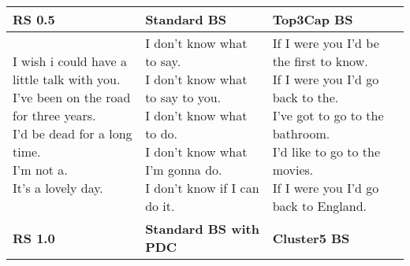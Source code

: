 \documentclass[thesis.tex]{subfiles}
\begin{document}
\begin{table*}[t]
\begin{tabular}{|l|l|l|}
    \hline \hline
    \footnotesize \textbf{RS 0.5} &  \footnotesize \textbf{Standard BS} &  \footnotesize \textbf{Top3Cap BS} \\
    \hline
\makecell[l]{
\tiny I wish i could have a little talk with you.\\
I've been on the road for three years.\\
I'd be dead for a long time.\\
I'm not a.\\
It's a lovely day.\\
}&
\makecell[l]{
I don't know what to say.\\
I don't know what to say to you.\\
I don't know what to do.\\
I don't know what I'm gonna do.\\
I don't know if I can do it.\\
}&
\makecell[l]{
\tiny If I were you I'd be the first to know.\\
If I were you I'd go back to the.\\
I've got to go to the bathroom.\\
I'd like to go to the movies.\\
\tiny If I were you I'd go back to England.\\
}
 \\
    \hline
    \hline
    \footnotesize \textbf{RS 1.0} & \footnotesize \textbf{Standard BS with PDC} &  \footnotesize \textbf{Cluster5 BS} \\
    \hline
    

\end{tabular}
\end{table*}
\end{document}
